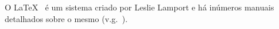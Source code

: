 O {\LaTeX}~\cite{Lamport.94} é um sistema criado por Leslie Lamport e
há inúmeros manuais detalhados sobre o mesmo (v.g.~\cite{Kopka.03}).
